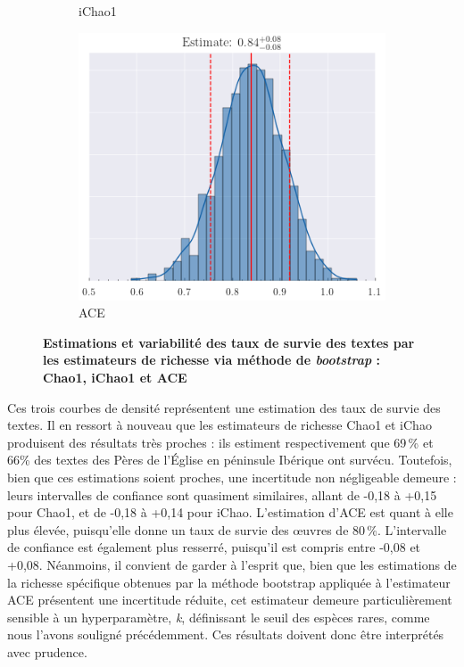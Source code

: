 \documentclass[a4paper,twoside,12pt]{book}
\begin{document}
\begin{figure}[h!]
\begin{subfigure}[b]{0.32\textwidth}
		\caption{iChao1}
		\label{fig:ichao1}
	\end{subfigure}
	\hfill
	\begin{subfigure}[b]{0.32\textwidth}
		\includegraphics[width=\textwidth]{img/aceboot.png}
		\caption{ACE}
		\label{fig:ace}
	\end{subfigure}
	
	\caption{\textbf{Estimations et variabilité des taux de survie des textes par les estimateurs de richesse via méthode de  \textit{bootstrap} : Chao1, iChao1 et ACE}}
	
	\label{fig:estimators}
\end{figure}

Ces trois courbes de densité représentent une estimation des taux de survie des textes. Il en ressort à nouveau que les estimateurs de richesse Chao1 et iChao produisent des résultats très proches : ils estiment respectivement que 69 \% et 66\% des textes des Pères de l'Église en péninsule Ibérique ont survécu. Toutefois, bien que ces estimations soient proches, une incertitude non négligeable demeure : leurs intervalles de confiance sont quasiment similaires, allant de -0,18 à +0,15 pour Chao1, et de -0,18 à +0,14 pour iChao. L’estimation d’ACE est quant à elle plus élevée, puisqu’elle donne un taux de survie des œuvres de 80 \%. L’intervalle de confiance est également plus resserré, puisqu’il est compris entre -0,08 et +0,08. Néanmoins, il convient de garder à l'esprit que, bien que les estimations de la richesse spécifique obtenues par la méthode bootstrap appliquée à l'estimateur ACE présentent une incertitude réduite, cet estimateur demeure particulièrement sensible à un hyperparamètre, \textit{k}, définissant le seuil des espèces rares, comme nous l’avons souligné précédemment. Ces résultats doivent donc être interprétés avec prudence.
\end{document}
